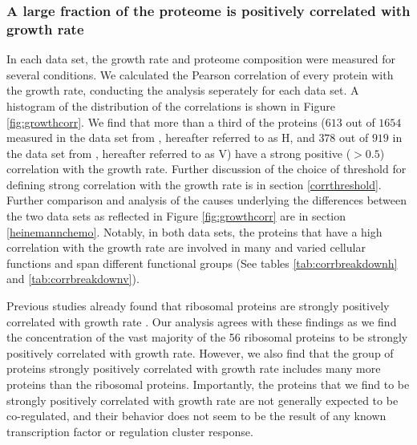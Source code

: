 \subsubsection{A large fraction of the proteome is positively correlated with growth rate}
In each data set, the growth rate and proteome composition were measured for several conditions.
We calculated the Pearson correlation of every protein with the growth rate, conducting the analysis seperately for each data set.
A histogram of the distribution of the correlations is shown in Figure \ref{fig:growthcorr}.
We find that more than a third of the proteins ($613$ out of $1654$ measured in the data set from \cite{Heinemann2015}, hereafter referred to as H, and $378$ out of $919$ in the data set from \cite{Valgepea2013}, hereafter referred to as V) have a strong positive ($>0.5$) correlation with the growth rate.
Further discussion of the choice of threshold for defining strong correlation with the growth rate is in section \ref{corrthreshold}.
Further comparison and analysis of the causes underlying the differences between the two data sets as reflected in Figure \ref{fig:growthcorr} are in section \ref{heinemannchemo}.
Notably, in both data sets, the proteins that have a high correlation with the growth rate are involved in many and varied cellular functions and span different functional groups (See tables \ref{tab:corrbreakdownh} and \ref{tab:corrbreakdownv}).

Previous studies already found that ribosomal proteins are strongly positively correlated with growth rate \cite{Pedersen1978a, ingraham1983growth, Klumpp2008}.
Our analysis agrees with these findings as we find the concentration of the vast majority of the 56 ribosomal proteins to be strongly positively correlated with growth rate.
However, we also find that the group of proteins strongly positively correlated with growth rate includes many more proteins than the ribosomal proteins.
Importantly, the proteins that we find to be strongly positively correlated with growth rate are not generally expected to be co-regulated, and their behavior does not seem to be the result of any known transcription factor or regulation cluster response.